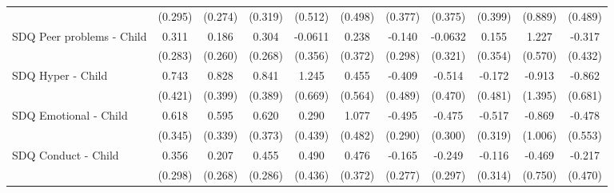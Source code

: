{\begin{tabular}{l*{10}{c}}
            &     (0.295)         &     (0.274)         &     (0.319)         &     (0.512)         &     (0.498)         &     (0.377)         &     (0.375)         &     (0.399)         &     (0.889)         &     (0.489)         \\
\addlinespace
SDQ Peer problems - Child&       0.311         &       0.186         &       0.304         &     -0.0611         &       0.238         &      -0.140         &     -0.0632         &       0.155         &       1.227\sym{*}  &      -0.317         \\
            &     (0.283)         &     (0.260)         &     (0.268)         &     (0.356)         &     (0.372)         &     (0.298)         &     (0.321)         &     (0.354)         &     (0.570)         &     (0.432)         \\
\addlinespace
SDQ Hyper - Child&       0.743         &       0.828\sym{*}  &       0.841\sym{*}  &       1.245         &       0.455         &      -0.409         &      -0.514         &      -0.172         &      -0.913         &      -0.862         \\
            &     (0.421)         &     (0.399)         &     (0.389)         &     (0.669)         &     (0.564)         &     (0.489)         &     (0.470)         &     (0.481)         &     (1.395)         &     (0.681)         \\
\addlinespace
SDQ Emotional - Child&       0.618         &       0.595         &       0.620         &       0.290         &       1.077\sym{*}  &      -0.495         &      -0.475         &      -0.517         &      -0.869         &      -0.478         \\
            &     (0.345)         &     (0.339)         &     (0.373)         &     (0.439)         &     (0.482)         &     (0.290)         &     (0.300)         &     (0.319)         &     (1.006)         &     (0.553)         \\
\addlinespace
SDQ Conduct - Child&       0.356         &       0.207         &       0.455         &       0.490         &       0.476         &      -0.165         &      -0.249         &      -0.116         &      -0.469         &      -0.217         \\
            &     (0.298)         &     (0.268)         &     (0.286)         &     (0.436)         &     (0.372)         &     (0.277)         &     (0.297)         &     (0.314)         &     (0.750)         &     (0.470)         \\
\bottomrule
\end{tabular}
}
